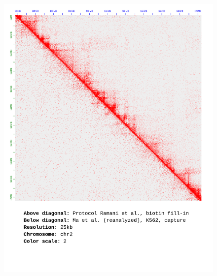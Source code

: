 \documentclass[a4paper,14pt]{extarticle}
\begin{document}
\begin{figure}[hp!] \includegraphics[width=1\textwidth]{ma-pe_s30_chr2_25kb_2.pdf} \end{figure}
\end{document}
